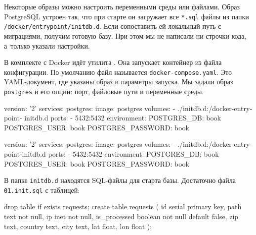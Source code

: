 Некоторые образы можно настроить переменными среды или файлами. Образ PostgreSQL
устроен так, что при старте он загружает все \verb|*.sql| файлы из папки
\texttt{/docker\-/entrypoint\-/initdb.d}. Если сопоставить ей локальный путь с
миграциями, получим готовую базу. При этом мы не написали ни строчки кода,
а~только указали настройки.


В комплекте с Docker идёт утилита . Она запускает
контейнер из файла конфигурации. По умолчанию файл называется
\verb|docker-compose.yaml|. Это YAML-документ, где указаны образ и параметры
запуска. Мы задали образ \verb|postgres| и его опции: порт, файловые пути и
переменные среды.


\ifnarrow

\begin{english}
  \begin{yaml}
version: '2'
services:
  postgres:
    image: postgres
    volumes:
      - ./initdb.d:/docker-entrypoint-
                                initdb.d
    ports:
      - 5432:5432
    environment:
      POSTGRES_DB: book
      POSTGRES_USER: book
      POSTGRES_PASSWORD: book
  \end{yaml}
\end{english}

\else

\begin{english}
  \begin{yaml}
version: '2'
services:
  postgres:
    image: postgres
    volumes:
      - ./initdb.d:/docker-entrypoint-initdb.d
    ports:
      - 5432:5432
    environment:
      POSTGRES_DB: book
      POSTGRES_USER: book
      POSTGRES_PASSWORD: book
  \end{yaml}
\end{english}

\fi

В папке \verb|initdb.d| находятся SQL-файлы для старта базы. Достаточно файла
\verb|01.init.sql| с таблицей:


\ifnarrow

\begin{english}
  \begin{sql}
drop table if exists requests;
create table requests (
    id            serial primary key,
    path          text not null,
    ip            inet not null,
    is_processed  boolean not null
                  default false,
    zip           text,
    country       text,
    city          text,
    lat           float,
    lon           float
);
  \end{sql}
\end{english}

